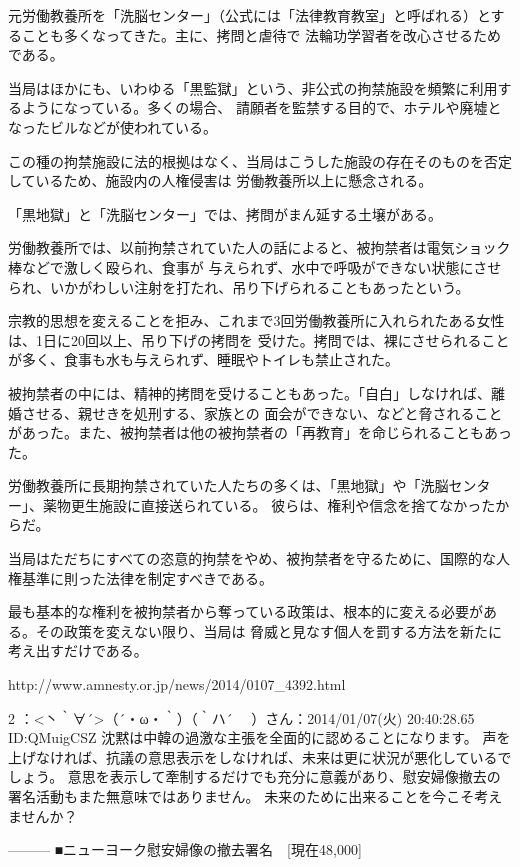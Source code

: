     元労働教養所を「洗脳センター」（公式には「法律教育教室」と呼ばれる）とすることも多くなってきた。主に、拷問と虐待で
    法輪功学習者を改心させるためである。

    当局はほかにも、いわゆる「黒監獄」という、非公式の拘禁施設を頻繁に利用するようになっている。多くの場合、
    請願者を監禁する目的で、ホテルや廃墟となったビルなどが使われている。

    この種の拘禁施設に法的根拠はなく、当局はこうした施設の存在そのものを否定しているため、施設内の人権侵害は
    労働教養所以上に懸念される。

    「黒地獄」と「洗脳センター」では、拷問がまん延する土壌がある。

    労働教養所では、以前拘禁されていた人の話によると、被拘禁者は電気ショック棒などで激しく殴られ、食事が
    与えられず、水中で呼吸ができない状態にさせられ、いかがわしい注射を打たれ、吊り下げられることもあったという。

    宗教的思想を変えることを拒み、これまで3回労働教養所に入れられたある女性は、1日に20回以上、吊り下げの拷問を
    受けた。拷問では、裸にさせられることが多く、食事も水も与えられず、睡眠やトイレも禁止された。

    被拘禁者の中には、精神的拷問を受けることもあった。「自白」しなければ、離婚させる、親せきを処刑する、家族との
    面会ができない、などと脅されることがあった。また、被拘禁者は他の被拘禁者の「再教育」を命じられることもあった。

    労働教養所に長期拘禁されていた人たちの多くは、「黒地獄」や「洗脳センター」、薬物更生施設に直接送られている。
    彼らは、権利や信念を捨てなかったからだ。

    当局はただちにすべての恣意的拘禁をやめ、被拘禁者を守るために、国際的な人権基準に則った法律を制定すべきである。

    最も基本的な権利を被拘禁者から奪っている政策は、根本的に変える必要がある。その政策を変えない限り、当局は
    脅威と見なす個人を罰する方法を新たに考え出すだけである。


    http://www.amnesty.or.jp/news/2014/0107_4392.html

2 ：<丶｀∀´>（´・ω・｀）（｀ハ´　 ）さん：2014/01/07(火) 20:40:28.65 ID:QMuigCSZ
    沈黙は中韓の過激な主張を全面的に認めることになります。
    声を上げなければ、抗議の意思表示をしなければ、未来は更に状況が悪化しているでしょう。
    意思を表示して牽制するだけでも充分に意義があり、慰安婦像撤去の署名活動もまた無意味ではありません。
    未来のために出来ることを今こそ考えませんか？

    ---------
    ■ニューヨーク慰安婦像の撤去署名　[現在48,000]

